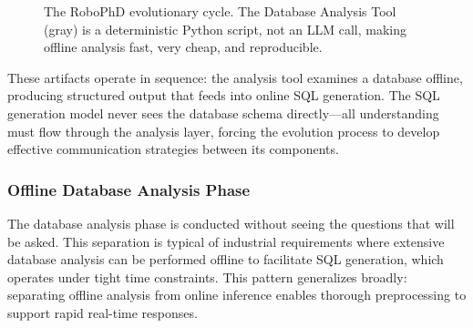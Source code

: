 \documentclass{article}
\begin{document}
\begin{figure}[ht]

    \caption{The RoboPhD evolutionary cycle. The Database Analysis Tool (gray) is a deterministic Python script, not an LLM call, making offline analysis fast, very cheap, and reproducible.} 
    \label{fig:bird-flowchart}
\end{figure}

These artifacts operate in sequence: the analysis tool examines a database offline, producing structured output that feeds into online SQL generation. The SQL generation model never sees the database schema directly---all understanding must flow through the analysis layer, forcing the evolution process to develop effective communication strategies between its components.

\subsubsection{Offline Database Analysis Phase}\label{subsubsec:database-analysis}

The database analysis phase is conducted without seeing the questions that will be asked. This separation is typical of industrial requirements where extensive database analysis can be performed offline to facilitate SQL generation, which operates under tight time constraints. This pattern generalizes broadly: separating offline analysis from online inference enables thorough preprocessing to support rapid real-time responses.
\end{document}
